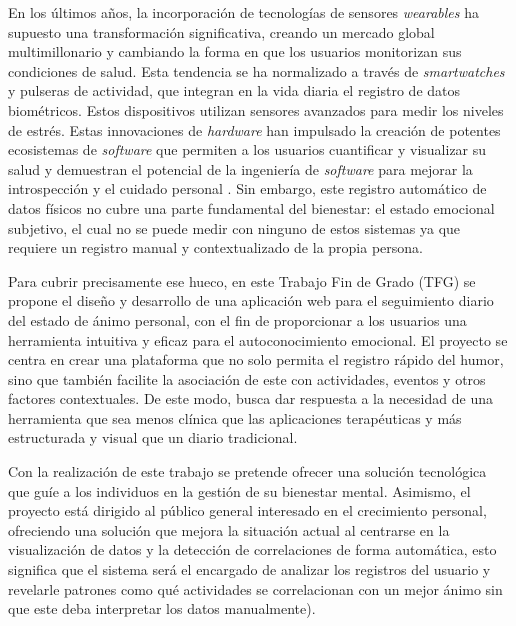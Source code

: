 En los últimos años, la incorporación de tecnologías de sensores \textit{wearables} ha supuesto una transformación significativa, creando un mercado global multimillonario y cambiando la forma en que los usuarios monitorizan sus condiciones de salud. Esta tendencia se ha normalizado a través de \textit{smartwatches} y pulseras de actividad, que integran en la vida diaria el registro de datos biométricos. Estos dispositivos utilizan sensores avanzados para medir los niveles de estrés. Estas innovaciones de \textit{hardware} han impulsado la creación de potentes ecosistemas de \textit{software} que permiten a los usuarios cuantificar y visualizar su salud y demuestran el potencial de la ingeniería de \textit{software} para mejorar la introspección y el cuidado personal \cite{perez2021recent}. Sin embargo, este registro automático de datos físicos no cubre una parte fundamental del bienestar: el estado emocional subjetivo, el cual no se puede medir con ninguno de estos sistemas ya que requiere un registro manual y contextualizado de la propia persona.

Para cubrir precisamente ese hueco, en este Trabajo Fin de Grado (TFG) se propone el diseño y desarrollo de una aplicación web para el seguimiento diario del estado de ánimo personal, con el fin de proporcionar a los usuarios una herramienta intuitiva y eficaz para el autoconocimiento emocional. El proyecto se centra en crear una plataforma que no solo permita el registro rápido del humor, sino que también facilite la asociación de este con actividades, eventos y otros factores contextuales. De este modo, busca dar respuesta a la necesidad de una herramienta que sea menos clínica que las aplicaciones terapéuticas y más estructurada y visual que un diario tradicional.


Con la realización de este trabajo se pretende ofrecer una solución tecnológica que guíe a los individuos en la gestión de su bienestar mental. Asimismo, el proyecto está dirigido al público general interesado en el crecimiento personal, ofreciendo una solución que mejora la situación actual al centrarse en la visualización de datos y la detección de correlaciones de forma automática, esto significa que el sistema será el encargado de analizar los registros del usuario y revelarle patrones como qué actividades se correlacionan con un mejor ánimo sin que este deba interpretar los datos manualmente).


